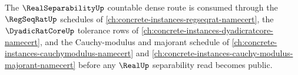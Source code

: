 The $\RealSeparabilityUp$ countable dense route is consumed through the $\RegSeqRatUp$ schedules of \autoref{ch:concrete-instances-regseqrat-namecert}, the $\DyadicRatCoreUp$ tolerance rows of \autoref{ch:concrete-instances-dyadicratcore-namecert}, and the Cauchy-modulus and majorant schedule of \autoref{ch:concrete-instances-cauchymodulus-namecert} and \autoref{ch:concrete-instances-cauchy-modulus-majorant-namecert} before any $\RealUp$ separability read becomes public.
